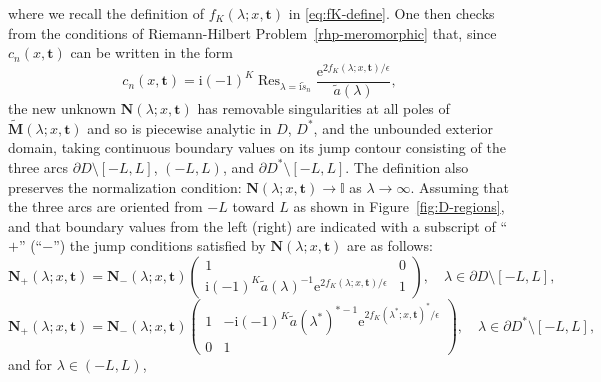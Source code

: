 \documentclass[12pt]{amsart}
\numberwithin{equation}{section}
\newcommand{\ee}{\mathrm{e}}
\newcommand{\ii}{\mathrm{i}}
\newcommand{\SP}{\lambda}
\begin{document}
where we recall the definition of $f_K(\SP;x,\mathbf{t})$ in \eqref{eq:fK-define}.
One then checks from the conditions of Riemann-Hilbert Problem~\ref{rhp-meromorphic} that, since $c_n(x,\mathbf{t})$ can be written in the form
\begin{equation}
c_n(x,\mathbf{t})=\ii (-1)^K\mathop{\mathrm{Res}}_{\SP=\ii \widetilde{s}_n}\frac{\ee^{2f_K(\SP;x,\mathbf{t})/\epsilon}}{\widetilde{a}(\SP)},
\end{equation}
the new unknown $\mathbf{N}(\SP;x,\mathbf{t})$ has removable singularities at all poles of $\widetilde{\mathbf{M}}(\SP;x,\mathbf{t})$ and so is piecewise analytic in $D$, $D^*$, and the unbounded exterior domain, taking continuous boundary values on its jump contour consisting of the three arcs $\partial D\setminus [-L,L]$, $(-L,L)$, and $\partial D^*\setminus[-L,L]$.  The definition also preserves the normalization condition: $\mathbf{N}(\SP;x,\mathbf{t})\to\mathbb{I}$ as $\SP\to\infty$.  Assuming that the three arcs are oriented from $-L$ toward $L$ as shown in Figure~\ref{fig:D-regions}, and that boundary values from the left (right) are indicated with a subscript of ``$+$'' (``$-$'') the jump conditions satisfied by $\mathbf{N}(\SP;x,\mathbf{t})$ are as follows:
\begin{equation}
\mathbf{N}_+(\SP;x,\mathbf{t})=\mathbf{N}_-(\SP;x,\mathbf{t})\begin{pmatrix}1 & 0\\
\ii (-1)^K \widetilde{a}(\SP)^{-1}\ee^{2f_K(\SP;x,\mathbf{t})/\epsilon} & 1
\end{pmatrix},\quad \SP\in\partial D\setminus [-L,L],
\label{eq:jump-N-up}
\end{equation}
\begin{equation}
\mathbf{N}_+(\SP;x,\mathbf{t})=\mathbf{N}_-(\SP;x,\mathbf{t})\begin{pmatrix}1 & -\ii (-1)^K \widetilde{a}(\SP^*)^{*-1}\ee^{2f_K(\SP^*; x,\mathbf{t})^*/\epsilon}\\0 & 1\end{pmatrix},\quad\SP\in\partial D^*\setminus[-L,L],
\end{equation}
and for $\SP\in (-L,L)$,
\end{document}
